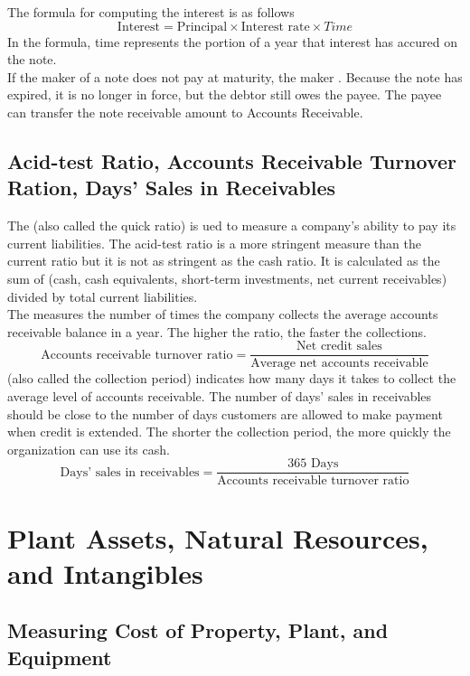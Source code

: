 \documentclass{article}
\begin{document}
The formula for computing the interest is as follows $$\textrm{Interest} = \textrm{Principal} \times \textrm{Interest rate} \times {Time}$$ In the formula, time represents the portion of a year that interest has accured on the note. \\ 

If the maker of a note does not pay at maturity, the maker . Because the note has expired, it is no longer in force, but the debtor still owes the payee. The payee can transfer the note receivable amount to Accounts Receivable. 

\subsection{Acid-test Ratio, Accounts Receivable Turnover Ration, Days' Sales in Receivables}

The  (also called the quick ratio) is ued to measure a company's ability to pay its current liabilities. The acid-test ratio is a more stringent measure than the current ratio but it is not as stringent as the cash ratio. It is calculated as the sum of (cash, cash equivalents, short-term investments, net current receivables) divided by total current liabilities. \\ 

The  measures the number of times the company collects the average accounts receivable balance in a year. The higher the ratio, the faster the collections. $$\textrm{Accounts receivable turnover ratio} = \frac{\textrm{Net credit sales}}{\textrm{Average net accounts receivable}}$$  (also called the collection period) indicates how many days it takes to collect the average level of accounts receivable. The number of days' sales in receivables should be close to the number of days customers are allowed to make payment when credit is extended. The shorter the collection period, the more quickly the organization can use its cash. $$\textrm{Days' sales in receivables} = \frac{\textrm{365 Days}}{\textrm{Accounts receivable turnover ratio}}$$

\section{Plant Assets, Natural Resources, and Intangibles}

\subsection{Measuring Cost of Property, Plant, and Equipment}
\end{document}
